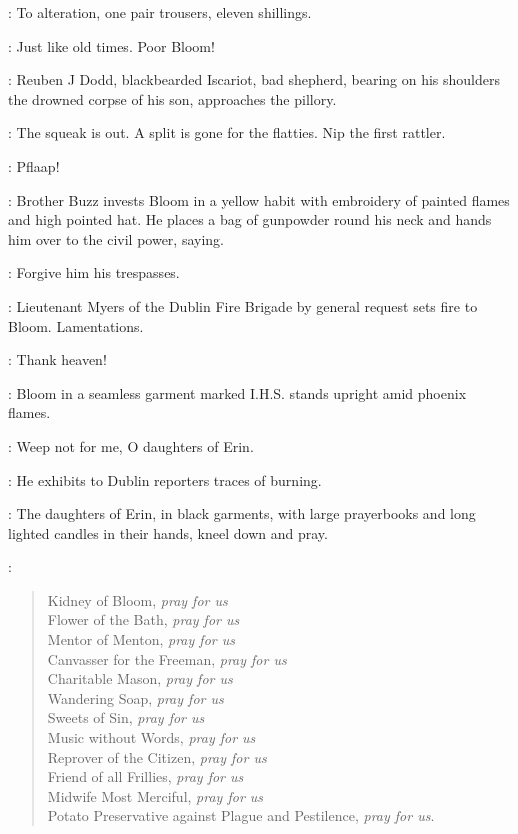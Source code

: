 \Mesias:
To alteration,
one pair trousers,
eleven shillings.

\Bloom:
Just like old times.
Poor Bloom!

:
Reuben J Dodd,
blackbearded Iscariot,
bad shepherd,
bearing on his shoulders the drowned corpse of his son,
approaches the pillory.%

\ReubenJ:
The squeak is out.
A split is gone for the flatties.
Nip the first rattler.

\FireBrigade:
Pflaap!

:
Brother Buzz invests Bloom in a yellow habit
with embroidery of painted flames and high pointed hat.
He places a bag of gunpowder round his neck
and hands him over to the civil power,
saying.

\BrotherBuzz:
Forgive him his trespasses.

:
Lieutenant Myers of the Dublin Fire Brigade
by general request sets fire to Bloom.
Lamentations.

\Citizen[1]:
Thank heaven!

:
Bloom in a seamless garment marked I.H.S.
stands upright amid phoenix flames.

\Bloom:
Weep not for me,
O daughters of Erin.

:
He exhibits to Dublin reporters traces of burning.

:
The daughters of Erin,
in black garments,
with large prayerbooks and long lighted candles in their hands,
kneel down and pray.

\DaughtersErin:
\begin{verse}
    Kidney of Bloom,
\emph{pray for us}\\
    Flower of the Bath,
\emph{pray for us}\\
    Mentor of Menton,
\emph{pray for us}\\
    Canvasser for the Freeman,
\emph{pray for us}\\
    Charitable Mason,
\emph{pray for us}\\
    Wandering Soap,
\emph{pray for us}\\
    Sweets of Sin,
\emph{pray for us}\\
    Music without Words,
\emph{pray for us}\\
    Reprover of the Citizen,
\emph{pray for us}\\
%
    Friend of all Frillies,
\emph{pray for us}\\
    Midwife Most Merciful,
\emph{pray for us}\\
    Potato Preservative against Plague and Pestilence,
\emph{pray for us}.
\end{verse}

